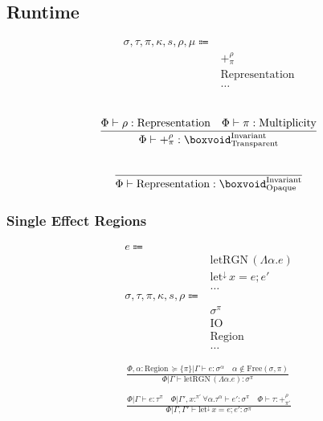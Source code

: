\documentclass {article}
\begin{document}
\subsection{Runtime}

\begin{align*}
\sigma, \tau, \pi, \kappa, s, \rho, \mu \Coloneqq & \\
& +^\rho_\pi \tag{Pretype}\\
& \text{Representation} \tag {Representation}\\
& \dots
\end{align*}

\begin{gather*}
\\
\frac
{\Phi \vdash \rho : \text{Representation} \quad \Phi \vdash \pi : \text{Multiplicity}}
{\Phi \vdash +^\rho_\pi : \boxvoid^\text{Invariant}_\text{Transparent}} \\
\\
\frac
{}
{\Phi \vdash \text{Representation} : \boxvoid^\text{Invariant}_\text{Opaque}}
\end{gather*}

\subsubsection{Single Effect Regions}
\begin{align*}
e \Coloneqq & \\
& \text{letRGN} \, (\Lambda \alpha. e) \tag{Create Region} \\
& \text{let}^\downarrow \, x = e; e' \tag{Runtime Let} \\
& \dots \\
\sigma, \tau, \pi, \kappa, s, \rho \Coloneqq & \\
& \sigma^\pi \tag{Region Effect} \\
& \text{IO} \tag{IO Region} \\
& \text{Region} \tag{Region} \\
& \dots
\end{align*}

\begin{gather*}
\frac
{\Phi , \alpha : \text{Region} \, \succeq \{ \pi \} | \Gamma \vdash e : \sigma^\alpha \quad \alpha \notin \text{Free}(\sigma, \pi)}
{\Phi | \Gamma \vdash \text{letRGN} \, (\Lambda \alpha. e) : \sigma^\pi} \\
\\
\frac
{\Phi | \Gamma \vdash e : \tau^\pi \quad \Phi | \Gamma', x :^{\pi'} \forall \alpha. \tau^\alpha \vdash e' : \sigma^\pi \quad \Phi \vdash \tau : +^{\rho}_{\pi'}}
{\Phi | \Gamma, \Gamma' \vdash \text{let}^\downarrow \, x = e; e' : \sigma^\pi}
\end{gather*}
\end{document}
